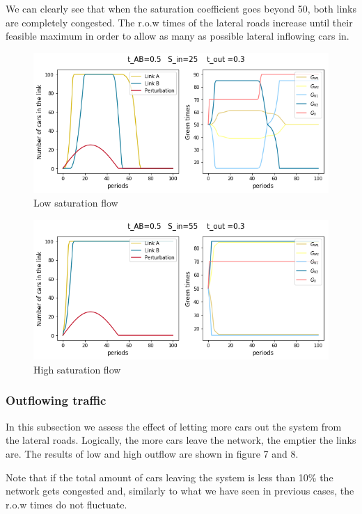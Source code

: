 \documentclass[11pt]{article}
\begin{document}
We can clearly see that when the saturation coefficient goes beyond 50, both links are completely congested. The r.o.w times of the lateral roads increase until their feasible maximum in order to allow as many as possible lateral inflowing cars in.

\begin{figure}[h!]
    \caption{Low saturation flow}
      \centering
	\includegraphics[width=13cm]{sim2}
\end{figure}

\begin{figure}[h!]
    \caption{High saturation flow}
      \centering
	\includegraphics[width=13cm]{sim7}
\end{figure}

\subsubsection{Outflowing traffic}

In this subsection we assess the effect of letting more cars out the system from the lateral roads. Logically, the more cars leave the network, the emptier the links are. The results of low and high outflow are shown in figure 7 and 8.

Note that if the total amount of cars leaving the system is less than 10\% the network gets congested and, similarly to what we have seen in previous cases, the r.o.w times do not fluctuate.
\end{document}
